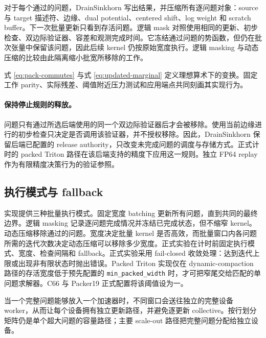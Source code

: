对于每个通过的问题，DrainSinkhorn 写出结果，并压缩所有逐问题对象：source 与 target 描述符、边缘、dual potential、centered shift、log weight 和 scratch buffer。下一次批量更新只看到存活问题。逻辑 mask 对照使用相同的更新、初步检查、双边际验证器、容差和观测完成时间。它冻结通过问题的势函数，但仍在批次张量中保留该问题，因此后续 kernel 仍按原始宽度执行。逻辑 masking 与动态压缩的比较由此隔离缩小批宽所移除的工作。

式 \eqref{eq:pack-commutes} 与式 \eqref{eq:updated-marginal} 定义理想算术下的变换。固定工作 parity、实际残差、阈值附近压力测试和应用端点共同刻画其实现行为。

\paragraph{保持停止规则的释放。}
问题只有通过所选后端使用的同一个双边际验证器后才会被移除。使用当前边缘进行的初步检查只决定是否调用该验证器，并不授权移除。因此，DrainSinkhorn 保留后端已配置的 release authority，只改变未完成问题的调度与存储方式。正式计时的 packed Triton 路径在该后端支持的精度下应用这一规则。独立 FP64 replay 作为有限精度决策行为的验证参照。

\subsection{执行模式与 fallback}

实现提供三种批量执行模式。固定宽度 batching 更新所有问题，直到共同的最终边界。逻辑 masking 记录逐问题完成情况并冻结已完成状态，但不缩窄 kernel。动态压缩移除通过的问题。宽度决定批量 kernel 是否高效，而批量窗口内各问题所需的迭代次数决定动态压缩可以移除多少宽度。正式实验在计时前固定执行模式、宽度、检查间隔和 fallback。正式实验采用 fail-closed 收敛处理：达到迭代上限或出现非有限状态时抛出错误。Packed Triton 实现仅在 dynamic-compaction 路径的存活宽度低于预先配置的 \texttt{min\_packed\_width} 时，才可把窄尾交给匹配的单问题求解器。C66 与 Packer19 正式配置将该阈值设为一。

当一个完整问题能够放入一个加速器时，不同窗口会送往独立的完整设备 worker，从而让每个设备拥有独立更新路径，并避免逐更新 collective。按行划分矩阵仍是单个超大问题的容量路径；主要 scale-out 路径把完整问题分配给独立设备。

